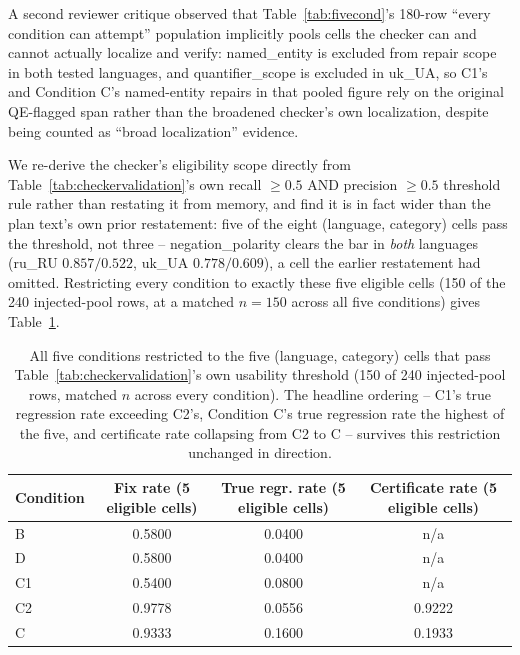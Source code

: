 \documentclass[11pt,letterpaper]{article}
\begin{document}
A second reviewer critique observed that Table~\ref{tab:fivecond}'s 180-row ``every condition can attempt'' population implicitly pools cells the checker can and cannot actually localize and verify: named\_entity is excluded from repair scope in both tested languages, and quantifier\_scope is excluded in uk\_UA, so C1's and Condition C's named-entity repairs in that pooled figure rely on the original QE-flagged span rather than the broadened checker's own localization, despite being counted as ``broad localization'' evidence.

We re-derive the checker's eligibility scope directly from Table~\ref{tab:checkervalidation}'s own recall $\geq 0.5$ AND precision $\geq 0.5$ threshold rule rather than restating it from memory, and find it is in fact wider than the plan text's own prior restatement: five of the eight (language, category) cells pass the threshold, not three -- negation\_polarity clears the bar in \emph{both} languages (ru\_RU $0.857/0.522$, uk\_UA $0.778/0.609$), a cell the earlier restatement had omitted. Restricting every condition to exactly these five eligible cells (150 of the 240 injected-pool rows, at a matched $n=150$ across all five conditions) gives Table~\ref{tab:eligible}.

\begin{table}[!htbp]
\centering
\small
\begin{tabular}{lccc}
\toprule
Condition & Fix rate (5 eligible cells) & True regr. rate (5 eligible cells) & Certificate rate (5 eligible cells) \\
\midrule
B & 0.5800 & 0.0400 & n/a \\
D & 0.5800 & 0.0400 & n/a \\
C1 & 0.5400 & 0.0800 & n/a \\
C2 & 0.9778 & 0.0556 & 0.9222 \\
C & 0.9333 & 0.1600 & 0.1933 \\
\bottomrule
\end{tabular}
\caption{All five conditions restricted to the five (language, category) cells that pass Table~\ref{tab:checkervalidation}'s own usability threshold (150 of 240 injected-pool rows, matched $n$ across every condition). The headline ordering -- C1's true regression rate exceeding C2's, Condition C's true regression rate the highest of the five, and certificate rate collapsing from C2 to C -- survives this restriction unchanged in direction.}
\label{tab:eligible}
\end{table}
\end{document}
